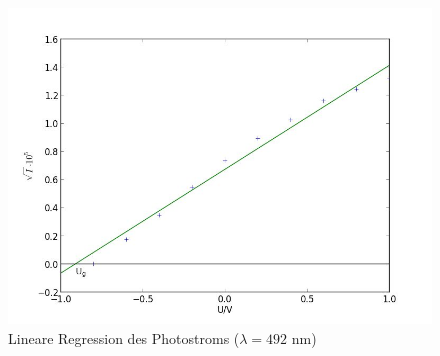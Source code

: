 	\begin{figure}[h]
		\begin{center}
		\includegraphics[scale=0.7]{picablaugrunlin.jpg}
		\caption{Lineare Regression des Photostroms ($\lambda=492$ nm)}
		\label{picablaugrunlin}
		\end{center}	
	\end{figure}